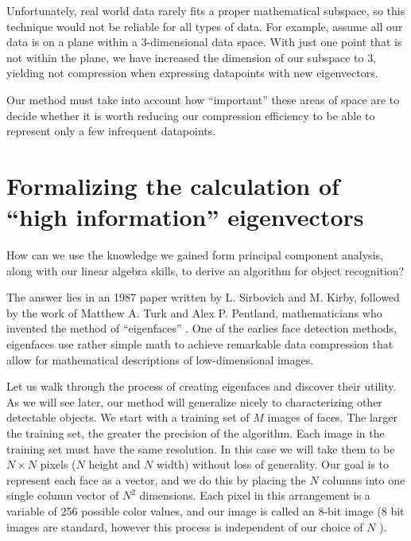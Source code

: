 \documentclass[12pt]{report}
\begin{document}
            Unfortunately, real world data rarely fits a proper mathematical subspace, so this technique would not be reliable for all types of data. For example, assume all our data is on a plane within a 3-dimensional data space. With just one point that is not within the plane, we have increased the dimension of our subspace to 3, yielding not compression when expressing datapoints with new eigenvectors.
            
            Our method must take into account how ``important'' these areas of space are to decide whether it is worth reducing our compression efficiency to be able to represent only a few infrequent datapoints.
                
        
        \section{Formalizing the calculation of ``high information'' eigenvectors}
            How can we use the knowledge we gained form principal component analysis, along with our linear algebra skills, to derive an algorithm for object recognition?

            The answer lies in an 1987 paper written by L. Sirbovich and M. Kirby, followed by the work of Matthew A. Turk and Alex P. Pentland, mathematicians who invented the method of ``eigenfaces'' \cite{Turk1991}. One of the earlies face detection methods, eigenfaces use rather simple math to achieve remarkable data compression that allow for mathematical descriptions of low-dimensional images.

            Let us walk through the process of creating eigenfaces and discover their utility. As we will see later, our method will generalize nicely to characterizing other detectable objects. We start with a training set of $M$ images of faces. The larger the training set, the greater the precision of the algorithm. Each image in the training set must have the same resolution. In this case we will take them to be $N \times N$ pixels ($N$ height and $N$ width) without loss of generality. Our goal is to represent each face as a vector, and we do this by placing the $N$ columns into one single column vector of $N^2$ dimensions. Each pixel in this arrangement is a variable of 256 possible color values, and our image is called an 8-bit image (8 bit images are standard, however this process is independent of our choice of $N$ \cite{Turk1991}).
\end{document}
